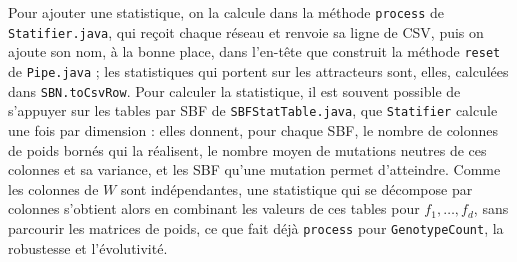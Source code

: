 Pour ajouter une statistique, on la calcule dans la méthode \texttt{process} de \texttt{Statifier.java}, qui reçoit chaque réseau et renvoie sa ligne de CSV, puis on ajoute son nom, à la bonne place, dans l'en-tête que construit la méthode \texttt{reset} de \texttt{Pipe.java} ; les statistiques qui portent sur les attracteurs sont, elles, calculées dans \texttt{SBN.toCsvRow}.
Pour calculer la statistique, il est souvent possible de s'appuyer sur les tables par SBF de \texttt{SBFStatTable.java}, que \texttt{Statifier} calcule une fois par dimension : elles donnent, pour chaque SBF, le nombre de colonnes de poids bornés qui la réalisent, le nombre moyen de mutations neutres de ces colonnes et sa variance, et les SBF qu'une mutation permet d'atteindre.
Comme les colonnes de $W$ sont indépendantes, une statistique qui se décompose par colonnes s'obtient alors en combinant les valeurs de ces tables pour $f_1, \dots, f_d$, sans parcourir les matrices de poids, ce que fait déjà \texttt{process} pour \texttt{GenotypeCount}, la robustesse et l'évolutivité.
